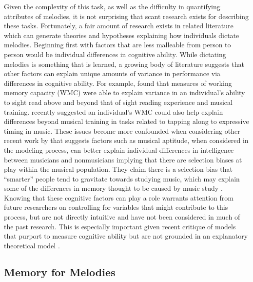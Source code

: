 \documentclass[12pt,]{book}
\begin{document}
Given the complexity of this task, as well as the difficulty in quantifying attributes of melodies, it is not surprising that scant research exists for describing these tasks.
Fortunately, a fair amount of research exists in related literature which can generate theories and hypotheses explaining how individuals dictate melodies.
Beginning first with factors that are less malleable from person to person would be individual differences in cognitive ability.
While dictating melodies is something that is learned, a growing body of literature suggests that other factors can explain
unique amounts of variance in performance via differences in cognitive ability.
For example, \citet{meinzDeliberatePracticeNecessary2010} found that measures of working memory capacity (WMC)
were able to explain variance in an individual's ability to sight read above and beyond that of sight reading experience and
musical training.
\citet{colleyWorkingMemoryAuditory2017} recently suggested an individual's WMC could also help explain differences beyond musical training in tasks related to tapping along to expressive timing in music.
These issues become more confounded when considering other recent work by \citet{swaminathanRevisitingAssociationMusic2017} that suggests factors such as musical aptitude, when considered in the modeling process, can better explain individual differences in intelligence between musicians and nonmusicians implying that there are selection biases at play within the musical population.
They claim there is a selection bias that ``smarter'' people tend to gravitate towards studying music, which may explain some of the differences in memory thought to be caused by music study \citep{talaminiMusiciansHaveBetter2017}.
Knowing that these cognitive factors can play a role warrants attention from future researchers on controlling for variables that might contribute to this process, but are not directly intuitive and have not been considered in much of the past
research.
This is especially important given recent critique of models that purport to measure cognitive ability but are not grounded in an explanatory theoretical model \citep{kovacsProcessOverlapTheory2016}.

\hypertarget{memory-for-melodies-1}{%
\subsection{Memory for Melodies}\label{memory-for-melodies-1}}
\end{document}
